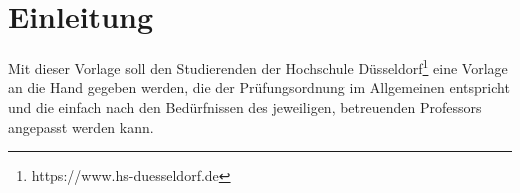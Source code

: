 \newpage
\section*{Einleitung}
Mit dieser Vorlage soll den Studierenden der Hochschule Düsseldorf\footnote{https://www.hs-duesseldorf.de} eine Vorlage an die Hand gegeben werden, die der Prüfungsordnung im Allgemeinen entspricht und die einfach nach den Bedürfnissen des jeweiligen, betreuenden Professors angepasst werden kann.
